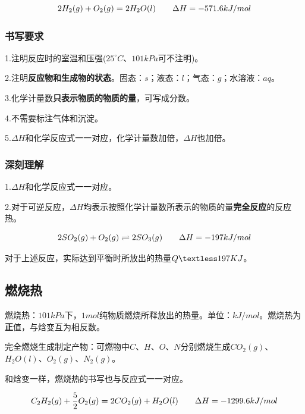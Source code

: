 \documentclass{ctexart}
\begin{document}
\begin{equation*}
    \centering
    2H_2(g)+O_2(g)\xlongequal{}{} 2H_2O(l)\qquad\Delta H=-571.6kJ/mol
\end{equation*}

\subsubsection{书写要求}

1.注明反应时的室温和压强($25^{\circ}C$、$101kPa$可不注明)。

2.注明\textbf{反应物和生成物的状态}。固态：$s$；液态：$l$；气态：$g$；水溶液：$aq$。

3.化学计量数\textbf{只表示物质的物质的量}，可写成分数。

4.不需要标注气体和沉淀。

5.$\Delta H$和化学反应式一一对应，化学计量数加倍，$\Delta H$也加倍。

\subsubsection{深刻理解}

1.$\Delta H$和化学反应式一一对应。

2.对于可逆反应，$\Delta H$均表示按照化学计量数所表示的物质的量\textbf{完全反应}的反应热。

\begin{equation*}
    \centering
    2SO_2(g)+O_2(g)\rightleftharpoons{}{} 2SO_3(g)\qquad\Delta H=-197kJ/mol
\end{equation*}

对于上述反应，实际达到平衡时所放出的热量$Q\textless 197KJ$。

\subsection{燃烧热}

燃烧热：$101kPa$下，$1mol$纯物质燃烧所释放出的热量。单位：$kJ/mol$。燃烧热为\textbf{正}值，与焓变互为相反数。

完全燃烧生成制定产物：可燃物中$C$、$H$、$O$、$N$分别燃烧生成$CO_2(g)$、$H_2O(l)$、$O_2(g)$、$N_2(g)$。

和焓变一样，燃烧热的书写也与反应式一一对应。

\begin{equation*}
    \centering
    C_2H_2(g)+\frac{5}{2}O_2(g)\xlongequal{}{}2CO_2(g)+H_2O(l)\qquad \Delta H=-1299.6kJ/mol
\end{equation*}
\end{document}

